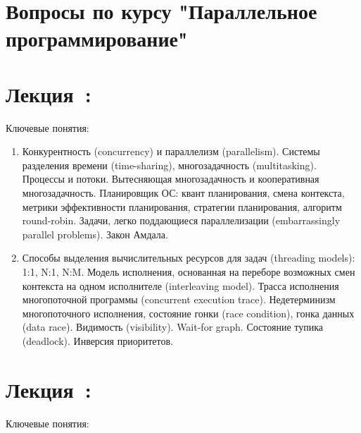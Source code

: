 \documentclass[a4paper, 12pt]{extarticle}
\title{}
\author{}
\date{}
\begin{document}
\section*{Вопросы по курсу "Параллельное программирование"}

\section{Лекция~\introNum: \introTopic}

Ключевые понятия: \introKey

\begin{enumerate}[\thesection .1]
	
	\item Конкурентность (concurrency) и параллелизм (parallelism). Системы разделения времени (time-sharing), многозадачность (multitasking). Процессы и потоки. Вытесняющая многозадачность и кооперативная многозадачность. Планировщик ОС: квант планирования, смена контекста, метрики эффективности планирования, стратегии планирования, алгоритм round-robin. Задачи, легко поддающиеся параллелизации (embarrassingly parallel problems). Закон Амдала.

	\item Способы выделения вычислительных ресурсов для задач (threading models): 1:1, N:1, N:M. Модель исполнения, основанная на переборе возможных смен контекста на одном исполнителе (interleaving model). Трасса исполнения многопоточной программы (concurrent execution trace). Недетерминизм многопоточного исполнения, состояние гонки (race condition), гонка данных (data race). Видимость (visibility). Wait-for graph. Состояние тупика (deadlock). Инверсия приоритетов.
\end{enumerate}

\section{Лекция~\basicNum: \basicTopic}

Ключевые понятия: \basicKey
\end{document}
